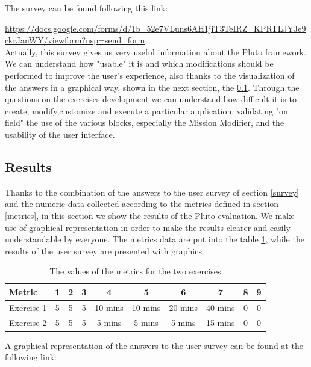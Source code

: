 The survey can be found following this link:

\url{https://docs.google.com/forms/d/1b_52e7VLuns6AH1jiT3TeIRZ_KPRTLJYJe9ckrJanWY/viewform?usp=send_form}
\\

Actually, this survey gives us very useful information about the Pluto framework. We can understand how "usable" it is and which modifications should be performed to improve the user's experience, also thanks to the visualization of the answers in a graphical way, shown in the next section, the \ref{surveyResult}.
Through the questions on the exercises development we can understand how difficult it is to create, modify,customize and execute a particular application, validating "on field" the use of the various blocks, especially the Mission Modifier, and the usability of the user interface.

\subsection{Results}\label{surveyResult}

Thanks to the combination of the answers to the user survey of section \ref{survey} and the numeric data collected according to the metrics defined in section \ref{metrics}, in this section we show the results of the Pluto evaluation.
We make use of graphical representation in order to make the results clearer and easily understandable by everyone.
The metrics data are put into the table \ref{surveyTable}, while the results of the user survey are presented with graphics.
\\

\begin{table} [htdp]
\centering
\caption{The values of the metrics for the two exercises}
\label{surveyTable}
    \begin{tabular}{|l|c|c|c|c|c|c|c|c|c|}
    \hline
    Metric & 1 & 2 & 3 &  4 &  5 & 6 &  7 & 8 & 9\\ \hline
    Exercise 1 & 5 & 5 & 5 & 10 mins & 10 mins & 20 mins & 40 mins & 0 & 0 \\ \hline
    Exercise 2 & 5 & 5 & 5 & 5 mins & 5 mins & 5 mins & 15 mins & 0 & 0
     \\ \hline
     \end{tabular}
    \end{table}


A graphical representation of the answers to the user survey can be found at the following link:
\\

